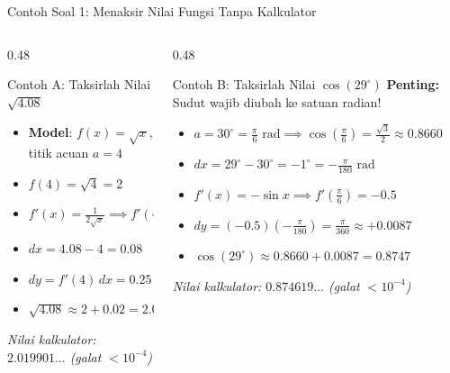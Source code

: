 \documentclass[aspectratio=169,10pt]{beamer}
\begin{document}
\begin{frame}{Contoh Soal 1: Menaksir Nilai Fungsi Tanpa Kalkulator}
    \begin{columns}[T]
        \begin{column}{0.48\textwidth}
            \begin{block}{Contoh A: Taksirlah Nilai $\sqrt{4.08}$}
                \begin{itemize}
                    \item \textbf{Model}: $f(x) = \sqrt{x}$, titik acuan $a = 4$
                    \item $f(4) = \sqrt{4} = 2$
                    \item $f'(x) = \frac{1}{2\sqrt{x}} \implies f'(4) = \frac{1}{4} = 0.25$
                    \item $dx = 4.08 - 4 = 0.08$
                    \item $dy = f'(4)\,dx = 0.25 \times 0.08 = \mathbf{0.02}$
                    \item $\sqrt{4.08} \approx 2 + 0.02 = \mathbf{2.02}$
                \end{itemize}
                \vspace{0.05cm}
                {\scriptsize \textit{Nilai kalkulator: $2.019901...$ (galat $< 10^{-4}$)}}
            \end{block}
        \end{column}

        \pause
        \begin{column}{0.48\textwidth}
            \begin{exampleblock}{Contoh B: Taksirlah Nilai $\cos(29^\circ)$}
                \textbf{Penting:} Sudut wajib diubah ke satuan radian!
                \begin{itemize}
                    \item $a = 30^\circ = \frac{\pi}{6}\text{ rad} \implies \cos\left(\frac{\pi}{6}\right) = \frac{\sqrt{3}}{2} \approx 0.8660$
                    \item $dx = 29^\circ - 30^\circ = -1^\circ = -\frac{\pi}{180}\text{ rad}$
                    \item $f'(x) = -\sin x \implies f'\left(\frac{\pi}{6}\right) = -0.5$
                    \item $dy = (-0.5)\left(-\frac{\pi}{180}\right) = \frac{\pi}{360} \approx +0.0087$
                    \item $\cos(29^\circ) \approx 0.8660 + 0.0087 = \mathbf{0.8747}$
                \end{itemize}
                \vspace{0.05cm}
                {\scriptsize \textit{Nilai kalkulator: $0.874619...$ (galat $< 10^{-4}$)}}
            \end{exampleblock}
        \end{column}
    \end{columns}
\end{frame}
\end{document}
